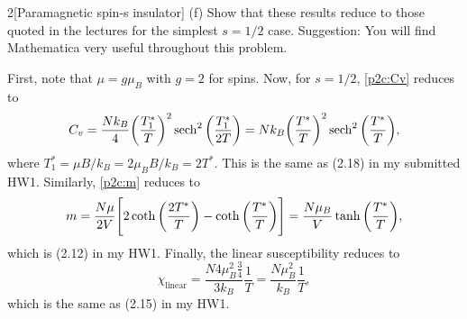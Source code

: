 \documentclass[12pt]{article}
\begin{document}
\begin{problem}{2}[Paramagnetic spin-s insulator]
(f) Show that these results reduce to those quoted in the lectures for the
simplest $s=1/2$ case. Suggestion: You will find Mathematica very useful
throughout this problem.
\begin{solution}
First, note that $\mu=g\mu_B$ with $g=2$ for spins. Now, for $s=1/2$,
\eqref{p2c:Cv} reduces to
\begin{equation}
    C_v=\frac{Nk_B}{4}\qty(\frac{T_1^\ast}{T})^2\sech^2\qty(\frac{T_1^\ast}{2T}) 
    =Nk_B\qty(\frac{T^\ast}{T})^2\sech^2\qty(\frac{T^\ast}{T}),
\end{equation}
where $T_1^\ast=\mu B/k_B=2\mu_BB/k_B=2T^\ast$. This is the same as (2.18) in my
submitted HW1. Similarly, \eqref{p2c:m} reduces to
\begin{equation}
    m=\frac{N\mu}{2V}\qty[2\coth\qty(\frac{2T^\ast}{T})-\coth\qty(\frac{T^\ast}{T})]
    =\frac{N\mu_B}{V}\tanh\qty(\frac{T^\ast}{T}),
\end{equation}
which is (2.12) in my HW1. Finally, the linear susceptibility reduces to
\begin{equation}
    \chi_\text{linear}=\frac{N4\mu_B^2\frac{3}{4}}{3k_B}\frac1T
    =\frac{N\mu_B^2}{k_B}\frac1T,
\end{equation}
which is the same as (2.15) in my HW1.
\end{solution}
\end{problem}
\newpage
\end{document}
